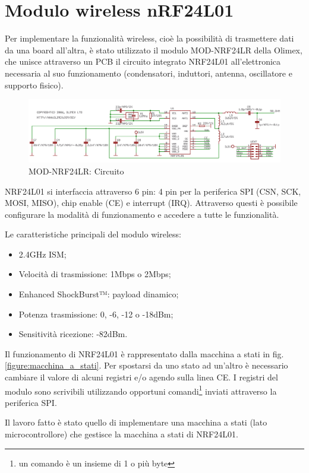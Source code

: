 \section{Modulo wireless nRF24L01}
Per implementare la funzionalità wireless, cioè la possibilità di trasmettere dati da una board all'altra, è stato utilizzato
il modulo MOD-NRF24LR della Olimex, che unisce attraverso un PCB il circuito integrato NRF24L01 all'elettronica necessaria
al suo funzionamento (condensatori, induttori, antenna, oscillatore e supporto fisico).\par
\begin{figure}[H]
	\centering
	\includegraphics[width=1.0\textwidth]{figure/MOD-NRF24L-ELECTRICAL.png}
	\caption{MOD-NRF24LR: Circuito}
\end{figure}
NRF24L01 si interfaccia attraverso 6 pin: 4 pin per la periferica SPI (CSN, SCK, MOSI, MISO), chip enable (CE) e interrupt (IRQ).
Attraverso questi è possibile configurare la modalità di funzionamento e accedere a tutte le funzionalità.\par
Le caratteristiche principali del modulo wireless:
\begin{itemize}
	\item 2.4GHz ISM;
	\item Velocità di trasmissione: 1Mbps o 2Mbps;
	\item Enhanced ShockBurst™: payload dinamico;
	\item Potenza trasmissione: 0, -6, -12 o -18dBm;
	\item Sensitività ricezione: -82dBm.
\end{itemize}
Il funzionamento di NRF24L01 è rappresentato dalla macchina a stati in fig. \ref{figure:macchina_a_stati}.
Per spostarsi da uno stato ad un'altro è necessario cambiare il valore di alcuni registri e/o agendo sulla linea CE. I registri del modulo sono scrivibili utilizzando opportuni comandi\footnote{ un comando è un insieme di 1 o più byte} inviati attraverso la periferica SPI.\par
Il lavoro fatto è stato quello di implementare una macchina a stati (lato microcontrollore) che gestisce la macchina a stati di NRF24L01.
